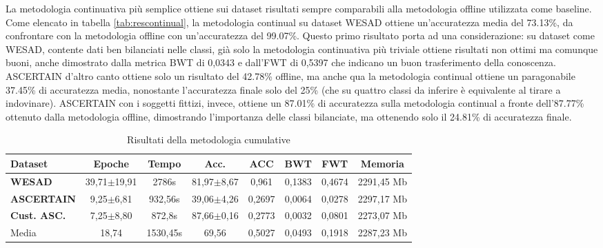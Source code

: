 La metodologia continuativa più semplice ottiene sui dataset risultati sempre comparabili alla metodologia offline utilizzata come baseline. Come elencato in tabella \ref{tab:rescontinual}, la metodologia continual su dataset WESAD ottiene un'accuratezza media del 73.13\%, da confrontare con la metodologia offline con un'accuratezza del 99.07\%. Questo primo risultato porta ad una considerazione: su dataset come WESAD, contente dati ben bilanciati nelle classi, già solo la metodologia continuativa più triviale ottiene risultati non ottimi ma comunque buoni, anche dimostrato dalla metrica BWT di 0,0343 e dall'FWT di 0,5397 che indicano un buon trasferimento della conoscenza.\\
ASCERTAIN d'altro canto ottiene solo un risultato del 42.78\% offline, ma anche qua la metodologia continual ottiene un paragonabile 37.45\% di accuratezza media, nonostante l'accuratezza finale solo del 25\% (che su quattro classi da inferire è equivalente al tirare a indovinare). ASCERTAIN con i soggetti fittizi, invece, ottiene un 87.01\% di accuratezza sulla metodologia continual a fronte dell'87.77\% ottenuto dalla metodologia offline, dimostrando l'importanza delle classi bilanciate, ma ottenendo solo il 24.81\% di accuratezza finale.

\begin{table}[h]
\footnotesize
    \begin{tabular}{l|c|c|c|c|c|c|c}
        \textbf{Dataset} & \textbf{Epoche} & \textbf{Tempo} & \textbf{Acc.} & \textbf{ACC} & \textbf{BWT} & \textbf{FWT} & \textbf{Memoria}\\
        \hline
        \textbf{WESAD} & 39,71$\pm$19,91 & 2786s & 81,97$\pm$8,67 & 0,961 & 0,1383 & 0,4674 & 2291,45 Mb\\
        \textbf{ASCERTAIN} & 9,25$\pm$6,81 & 932,56s & 39,06$\pm$4,26 & 0,2697 & 0,0064 & 0,0278 & 2297,17 Mb\\
        \textbf{Cust. ASC.} & 7,25$\pm$8,80 & 872,8s & 87,66$\pm$0,16 & 0,2773 & 0,0032 & 0,0801 & 2273,07 Mb\\
        \hline
        Media & 18,74 & 1530,45s & 69,56 & 0,5027 & 0,0493 & 0,1918 & 2287,23 Mb
    \end{tabular}
    \caption{Risultati della metodologia cumulative}
    \label{tab:rescumulative}
\end{table}

